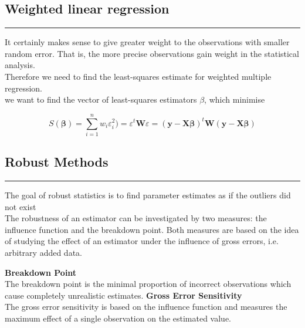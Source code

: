 \subsection{Weighted linear regression}
\noindent\rule[\linienAbstand]{\linewidth}{\linienDicke}
It certainly makes sense to give greater weight to the observations with smaller random error. That is, the more precise observations gain weight in the statistical analysis.\\
Therefore we need to find the least-squares estimate for weighted multiple regression.\\
we want to find the vector of least-squares estimators $\beta$, which minimise

\begin{equation}
  S(\mathbf{\beta}) = \sum^n_{i = 1}w_i\varepsilon^2_i) = \varepsilon^t \mathbf{W} \varepsilon =
  (\mathbf{y}-\mathbf{X}\mathbf{\beta})^t \mathbf{W}(\mathbf{y}-\mathbf{X}\mathbf{\beta})
\end{equation}

\subsection{Robust Methods}
\noindent\rule[\linienAbstand]{\linewidth}{\linienDicke}
The goal of robust statistics is to find parameter estimates as if the outliers did not exist\\

The robustness of an estimator can be investigated by two measures: the influence function and the breakdown point. Both measures are based on the idea of studying the effect of an estimator under the influence of gross errors, i.e. arbitrary added data.

\textbf{Breakdown Point}\\
The breakdown point is the minimal proportion of incorrect observations which cause completely unrealistic estimates.
\textbf{Gross Error Sensitivity}\\
The gross error sensitivity is based on the influence function and measures the maximum effect of a single observation on the estimated value.

